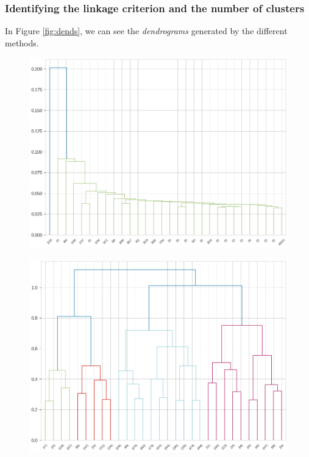\documentclass[a4paper,11pt,dvipsnames]{article}
\begin{document}
\subsubsection{Identifying the linkage criterion and the number of clusters}
 In Figure \ref{fig:dends}, we can see the \textit{dendrograms} generated by the different methods.

\begin{figure}[h!]
\begin{minipage}[b]{.25\linewidth}
    \centering
    \includegraphics[width=\textwidth]{Graphs/h_single.png}\label{fig:MIN_dend}
    \end{minipage}\hfill
    \begin{minipage}[b]{.25\linewidth}
    \centering
    \includegraphics[width=\textwidth]{Graphs/h_complete.png}\label{fig:MAX_dend}

\end{minipage}
\end{figure}
\end{document}
